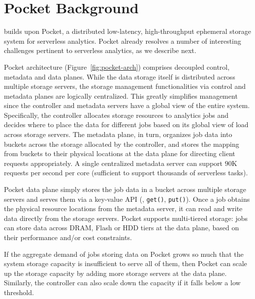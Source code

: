 \section{Pocket Background}
\label{sec:requirements}
\label{sec:motivation}
\label{ssec:pocket}

\jiffy builds upon Pocket, a distributed low-latency, high-throughput ephemeral storage system for serverless analytics. Pocket already resolves a number of interesting challenges pertinent to serverless analytics, as we describe next.


 Pocket architecture (Figure~\ref{fig:pocket-arch}) comprises decoupled control, metadata and data planes. While the data storage itself is distributed across multiple storage servers, the storage management functionalities via control and metadata planes are logically centralized. This greatly simplifies management since the controller and metadata servers have a global view of the entire system. Specifically, the controller allocates storage resources to analytics jobs and decides where to place the data for different jobs based on its global view of load across storage servers. The metadata plane, in turn, organizes job data into buckets across the storage allocated by the controller, and stores the mapping from buckets to their physical locations at the data plane for directing client requests appropriately. A single centralized metadata server can support $90$K requests per second per core (sufficient to support thousands of serverless tasks).

 Pocket data plane simply stores the job data in a bucket across multiple storage servers and serves them via a key-value API (\ie, \texttt{get()}, \texttt{put()}). Once a job obtains the physical resource locations from the metadata server, it can read and write data directly from the storage servers. Pocket supports multi-tiered storage: jobs can store data across DRAM, Flash or HDD tiers at the data plane, based on their performance and/or cost constraints.

 If the aggregate demand of jobs storing data on Pocket grows so much that the system storage capacity is insufficient to serve all of them, then Pocket can scale up the storage capacity by adding more storage servers at the data plane. %
Similarly, the controller can also scale down the capacity if it falls below a low threshold.


